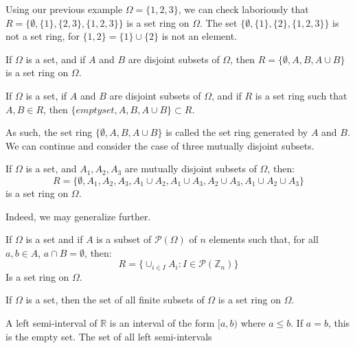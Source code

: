     Using our previous example $\Omega=\{1,2,3\}$,
    we can check laboriously that
    $R=\{\emptyset,\{1\},\{2,3\},\{1,2,3\}\}$ is a
    set ring on $\Omega$. The set
    $\{\emptyset,\{1\},\{2\},\{1,2,3\}\}$ is not
    a set ring, for $\{1,2\}=\{1\}\cup\{2\}$ is not
    an element.
    \begin{theorem}
        If $\Omega$ is a set, and if $A$ and $B$ are
        disjoint subsets of $\Omega$, then
        $R=\{\emptyset,A,B,A\cup{B}\}$ is a set ring
        on $\Omega$.
    \end{theorem}
    \begin{theorem}
        If $\Omega$ is a set, if $A$ and $B$ are
        disjoint subsets of $\Omega$, and if
        $R$ is a set ring such that $A,B\in{R}$,
        then $\{emptyset,A,B,A\cup{B}\}\subset{R}$.
    \end{theorem}
    As such, the set ring $\{\emptyset,A,B,A\cup{B}\}$
    is called the set ring generated by $A$ and $B$. We
    can continue and consider the case of three mutually
    disjoint subsets.
    \begin{theorem}
        If $\Omega$ is a set, and $A_{1},A_{2},A_{3}$ are
        mutually disjoint subsets of $\Omega$, then:
        \begin{equation}
            R=\{\emptyset,A_{1},A_{2},A_{3},
                A_{1}\cup{A}_{2},A_{1}\cup{A}_{3},
                A_{2}\cup{A}_{3},
                A_{1}\cup{A}_{2}\cup{A}_{3}\}
        \end{equation}
        is a set ring on $\Omega$.
    \end{theorem}
    Indeed, we may generalize further.
    \begin{theorem}
        If $\Omega$ is a set and if
        $A$ is a subset of $\mathcal{P}(\Omega)$ of
        $n$ elements such that, for all
        $a,b\in{A}$, $a\cap{B}=\emptyset$, then:
        \begin{equation}
            R=\{\cup_{i\in{I}}A_{i}:
            I\in\mathcal{P}(\mathbb{Z}_{n})\}
        \end{equation}
        Is a set ring on $\Omega$.
    \end{theorem}
    \begin{theorem}
        If $\Omega$ is a set, then the set of all
        finite subsets of $\Omega$ is a set ring on
        $\Omega$.
    \end{theorem}
    A left semi-interval of $\mathbb{R}$ is an interval
    of the form $[a,b)$ where $a\leq{b}$. If $a=b$, this
    is the empty set. The set of all left semi-intervals
